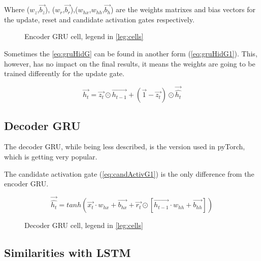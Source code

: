Where ($w_z$,$\overrightarrow{b_z}$), ($w_r$,$\overrightarrow{b_r}$),($w_{hx}$,$w_{hh}$,$\overrightarrow{b_h}$) are the weights matrixes and bias vectors for the update, reset and candidate activation gates respectively.

\begin{figure}[H]
  \centering
  
  \label{fig:lstmCell}
  \caption{Encoder \acs{GRU} cell, legend in \cref{leg:cells}}
\end{figure}

Sometimes the \cref{eq:gruHidG} can be found in another form (\cref{eq:gruHidG1})\cite{gruPyTorch}. This, however, has no impact on the final results, it means the weights are going to be trained differently for the update gate.

\begin{equation}\label{eq:gruHidG1}
  \overrightarrow{h_t}=\overrightarrow{z_t}\odot \overrightarrow{h_{t-1}} + (\overrightarrow{1}-\overrightarrow{z_t})\odot \overrightarrow{\hat{h_t}}
\end{equation}

\subsection{Decoder \ac{GRU}}

The decoder \ac{GRU}, while being less described, is the version used in pyTorch, which is getting very popular.

The candidate activation gate (\cref{eq:candActivG1}) is the only difference from the encoder \ac{GRU}.

\begin{equation}\label{eq:candActivG1}
  \overrightarrow{\hat{h_t}}=tanh(\overrightarrow{x_t}\cdot w_{hx}+ \overrightarrow{b_{hx}}+\overrightarrow{r_t}\odot[\overrightarrow{h_{t-1}} \cdot w_{hh} + \overrightarrow{b_{hh}}])
\end{equation}

\begin{figure}[H]
  \centering
  
  \label{fig:lstmCell}
  \caption{Decoder \acs{GRU} cell, legend in \cref{leg:cells}}
\end{figure}

\subsection{Similarities with \ac{LSTM}}

